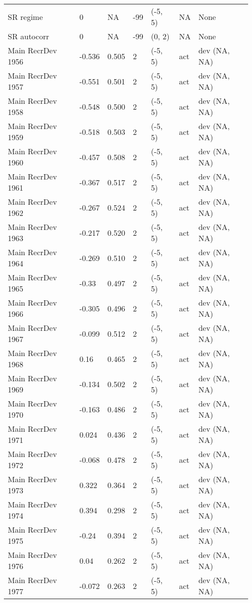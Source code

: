 \documentclass[11pt,
  letterpaper,
]{article}
\begin{document}
\begin{landscape}
\begin{longtable}[t]{>{\raggedright\arraybackslash}p{7.5cm}lllll>{\raggedright\arraybackslash}p{3.5cm}}
SR regime & 0 & NA & -99 & (-5, 5) & NA & None\\
SR autocorr & 0 & NA & -99 & (0, 2) & NA & None\\
Main RecrDev 1956 & -0.536 & 0.505 & 2 & (-5, 5) & act & dev (NA, NA)\\
Main RecrDev 1957 & -0.551 & 0.501 & 2 & (-5, 5) & act & dev (NA, NA)\\
Main RecrDev 1958 & -0.548 & 0.500 & 2 & (-5, 5) & act & dev (NA, NA)\\
Main RecrDev 1959 & -0.518 & 0.503 & 2 & (-5, 5) & act & dev (NA, NA)\\
Main RecrDev 1960 & -0.457 & 0.508 & 2 & (-5, 5) & act & dev (NA, NA)\\
Main RecrDev 1961 & -0.367 & 0.517 & 2 & (-5, 5) & act & dev (NA, NA)\\
Main RecrDev 1962 & -0.267 & 0.524 & 2 & (-5, 5) & act & dev (NA, NA)\\
Main RecrDev 1963 & -0.217 & 0.520 & 2 & (-5, 5) & act & dev (NA, NA)\\
Main RecrDev 1964 & -0.269 & 0.510 & 2 & (-5, 5) & act & dev (NA, NA)\\
Main RecrDev 1965 & -0.33 & 0.497 & 2 & (-5, 5) & act & dev (NA, NA)\\
Main RecrDev 1966 & -0.305 & 0.496 & 2 & (-5, 5) & act & dev (NA, NA)\\
Main RecrDev 1967 & -0.099 & 0.512 & 2 & (-5, 5) & act & dev (NA, NA)\\
Main RecrDev 1968 & 0.16 & 0.465 & 2 & (-5, 5) & act & dev (NA, NA)\\
Main RecrDev 1969 & -0.134 & 0.502 & 2 & (-5, 5) & act & dev (NA, NA)\\
Main RecrDev 1970 & -0.163 & 0.486 & 2 & (-5, 5) & act & dev (NA, NA)\\
Main RecrDev 1971 & 0.024 & 0.436 & 2 & (-5, 5) & act & dev (NA, NA)\\
Main RecrDev 1972 & -0.068 & 0.478 & 2 & (-5, 5) & act & dev (NA, NA)\\
Main RecrDev 1973 & 0.322 & 0.364 & 2 & (-5, 5) & act & dev (NA, NA)\\
Main RecrDev 1974 & 0.394 & 0.298 & 2 & (-5, 5) & act & dev (NA, NA)\\
Main RecrDev 1975 & -0.24 & 0.394 & 2 & (-5, 5) & act & dev (NA, NA)\\
Main RecrDev 1976 & 0.04 & 0.262 & 2 & (-5, 5) & act & dev (NA, NA)\\
Main RecrDev 1977 & -0.072 & 0.263 & 2 & (-5, 5) & act & dev (NA, NA)\\

\end{longtable}
\end{landscape}
\end{document}

